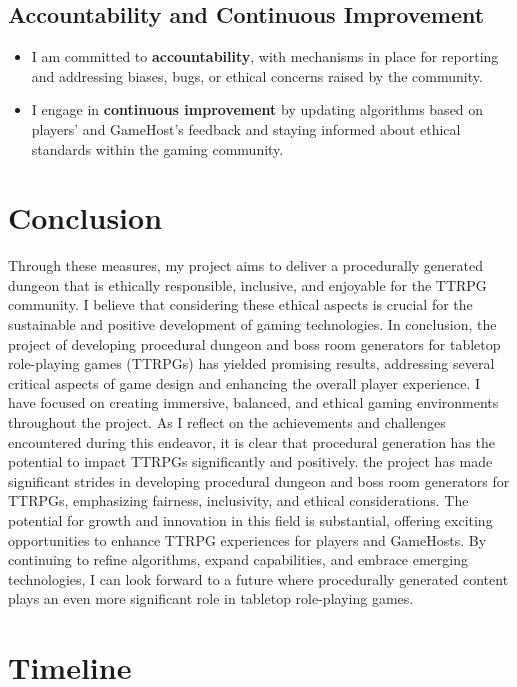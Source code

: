 \documentclass[10pt,twocolumn]{article}
\begin{document}
\subsection{Accountability and Continuous Improvement}
\begin{itemize}
    \item I am committed to \textbf{accountability}, with mechanisms in place for reporting and addressing biases, bugs, or ethical concerns raised by the community.
    \item I engage in \textbf{continuous improvement} by updating algorithms based on players' and GameHost's feedback and staying informed about ethical standards within the gaming community.\cite{igda2019ethics}
\end{itemize}

\section{Conclusion}
Through these measures, my project aims to deliver a procedurally generated dungeon that is ethically responsible, inclusive, and enjoyable for the TTRPG community. I believe that considering these ethical aspects is crucial for the sustainable and positive development of gaming technologies.
In conclusion, the project of developing procedural dungeon and boss room generators for tabletop role-playing games (TTRPGs) has yielded promising results, addressing several critical aspects of game design and enhancing the overall player experience. I have focused on creating immersive, balanced, and ethical gaming environments throughout the project. As I reflect on the achievements and challenges encountered during this endeavor, it is clear that procedural generation has the potential to impact TTRPGs significantly and positively. the project has made significant strides in developing procedural dungeon and boss room generators for TTRPGs, emphasizing fairness, inclusivity, and ethical considerations. The potential for growth and innovation in this field is substantial, offering exciting opportunities to enhance TTRPG experiences for players and GameHosts. By continuing to refine algorithms, expand capabilities, and embrace emerging technologies, I can look forward to a future where procedurally generated content plays an even more significant role in tabletop role-playing games.


\section{Timeline}
\end{document}

